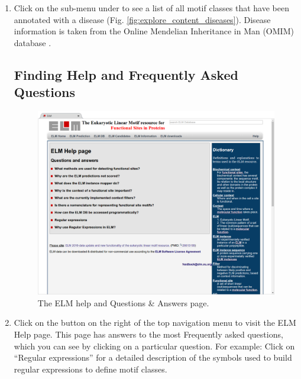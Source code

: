\begin{enumerate}
\item Click on the sub-menu  under  to see
	a list of all motif classes that have been annotated with a disease
	(Fig. \ref{fig:explore_content_diseases}). Disease information is taken
	from the Online Mendelian Inheritance in Man (OMIM) database
	\cite{17357067}.

%
%
\subsection{Finding Help and Frequently Asked Questions}
\label{subsec:explore_content_help}

\begin{figure}[h!]
	\centering
	\includegraphics[width=\textwidth]{Figures/explore_content/help.png} 
	\caption{
		The ELM help and Questions \& Answers page.
	}
	\label{fig:explore_content_viruses}
\end{figure}

\item Click on the  button on the right of the top navigation menu
	to visit the ELM Help page. This page has answers to the most
	Frequently asked questions, which you can see by clicking on a
	particular question. For example: Click on ``Regular expressions'' for
	a detailed description of the symbols used to build regular expressions
	to define motif classes.
\end{enumerate}

